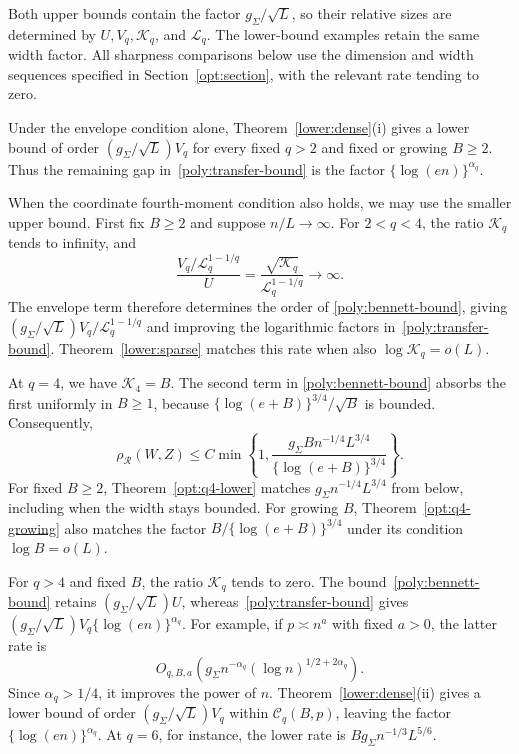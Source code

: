 \documentclass[11pt,letterpaper]{article}
\theoremstyle{remark}
\newcommand{\rh}{\rho_{\mathcal R}}
\begin{document}
Both upper bounds contain the factor $g_\Sigma/\sqrt L$, so their
relative sizes are determined by $U,V_q,\mathcal K_q$, and
$\mathcal L_q$. The lower-bound examples retain the same width
factor. All sharpness comparisons below use the dimension and width
sequences specified in Section~\ref{opt:section}, with the relevant
rate tending to zero.

Under the envelope condition alone,
Theorem~\ref{lower:dense}\textup{(i)} gives a lower bound of order
$(g_\Sigma/\sqrt L)V_q$ for every fixed $q>2$ and fixed or growing
$B\ge2$. Thus the remaining gap in~\eqref{poly:transfer-bound} is
the factor $\{\log(en)\}^{\alpha_q}$.

When the coordinate fourth-moment condition also holds, we may use
the smaller upper bound. First fix $B\ge2$ and suppose $n/L\to\infty$.
For $2<q<4$, the ratio $\mathcal K_q$ tends to infinity, and
\[
 \frac{V_q/\mathcal L_q^{1-1/q}}U
 =\frac{\sqrt{\mathcal K_q}}{\mathcal L_q^{1-1/q}}\to\infty.
\]
The envelope term therefore determines the order of
\eqref{poly:bennett-bound}, giving
$(g_\Sigma/\sqrt L)V_q/\mathcal L_q^{1-1/q}$ and improving the
logarithmic factors in~\eqref{poly:transfer-bound}.
Theorem~\ref{lower:sparse} matches this rate when also
$\log\mathcal K_q=o(L)$.

At $q=4$, we have $\mathcal K_4=B$. The second term in
\eqref{poly:bennett-bound} absorbs the first uniformly in $B\ge1$,
because $\{\log(e+B)\}^{3/4}/\sqrt B$ is bounded. Consequently,
\begin{equation}
 \rh(W,Z)\le C\min\left\{1,
 \frac{g_\Sigma Bn^{-1/4}L^{3/4}}
 {\{\log(e+B)\}^{3/4}}\right\}.
 \label{poly:q4}
\end{equation}
For fixed $B\ge2$, Theorem~\ref{opt:q4-lower} matches
$g_\Sigma n^{-1/4}L^{3/4}$ from below, including when the width
stays bounded. For growing $B$, Theorem~\ref{opt:q4-growing} also
matches the factor $B/\{\log(e+B)\}^{3/4}$ under its condition
$\log B=o(L)$.

For $q>4$ and fixed $B$, the ratio $\mathcal K_q$ tends to zero.
The bound~\eqref{poly:bennett-bound} retains
$(g_\Sigma/\sqrt L)U$, whereas~\eqref{poly:transfer-bound} gives
$(g_\Sigma/\sqrt L)V_q\{\log(en)\}^{\alpha_q}$.
For example, if $p\asymp n^a$ with fixed $a>0$, the latter rate is
\[
 O_{q,B,a}\!\left(g_\Sigma n^{-\alpha_q}
                    (\log n)^{1/2+2\alpha_q}\right).
\]
Since $\alpha_q>1/4$, it improves the power of $n$.
Theorem~\ref{lower:dense}\textup{(ii)} gives a lower bound of order
$(g_\Sigma/\sqrt L)V_q$ within $\mathcal C_q(B,p)$, leaving the
factor $\{\log(en)\}^{\alpha_q}$. At $q=6$, for instance, the
lower rate is $Bg_\Sigma n^{-1/3}L^{5/6}$.
\end{document}
